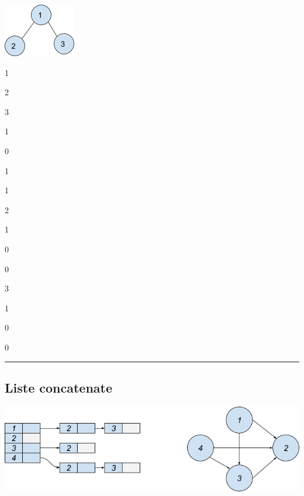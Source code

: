 \documentclass{article}
\begin{document}
{{}

{}

\protect\hypertarget{t.1db15af38187ce98dc87977567f42b70be1e9c99}{}{}\protect\hypertarget{t.38}{}{}

{\includegraphics{images/image535.png}}

{}

{1}

{2}

{3}

{1}

{0}

{1}

{1}

{2}

{1}

{0}

{0}

{3}

{1}

{0}

{0}

{}

{}

\begin{center}\rule{0.5\linewidth}{\linethickness}\end{center}

\subsection{\texorpdfstring{{}}{}}\label{h.fq77zq901ude}

\hypertarget{h.qwq1tiruc9xg}{\subsection{\texorpdfstring{{Liste
concatenate}}{Liste concatenate}}\label{h.qwq1tiruc9xg}}

{}

{\includegraphics{images/image537.png}}

}
\end{document}
